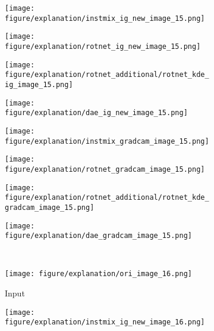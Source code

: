 \documentclass{article} \usepackage{iclr2021_conference,times}
\begin{document}
\begin{figure}[h!]
\begin{subfigure}{.11\textwidth}
  \centering
  \texttt{[image: figure/explanation/instmix\_ig\_new\_image\_15.png]}
\end{subfigure}
\hspace{-2mm}
\begin{subfigure}{.11\textwidth}
  \centering
  \texttt{[image: figure/explanation/rotnet\_ig\_new\_image\_15.png]}
\end{subfigure}
\hspace{-2mm}
\begin{subfigure}{.11\textwidth}
  \centering
  \texttt{[image: figure/explanation/rotnet\_additional/rotnet\_kde\_ig\_image\_15.png]}
\end{subfigure}
\hspace{-2mm}
\begin{subfigure}{.11\textwidth}
  \centering
  \texttt{[image: figure/explanation/dae\_ig\_new\_image\_15.png]}
\end{subfigure}
\hspace{-2mm}
\begin{subfigure}{.11\textwidth}
  \centering
  \texttt{[image: figure/explanation/instmix\_gradcam\_image\_15.png]}
\end{subfigure}
\hspace{-2mm}
\begin{subfigure}{.11\textwidth}
  \centering
  \texttt{[image: figure/explanation/rotnet\_gradcam\_image\_15.png]}
\end{subfigure}
\hspace{-2mm}
\begin{subfigure}{.11\textwidth}
  \centering
  \texttt{[image: figure/explanation/rotnet\_additional/rotnet\_kde\_gradcam\_image\_15.png]}
\end{subfigure}
\hspace{-2mm}
\begin{subfigure}{.11\textwidth}
  \centering
  \texttt{[image: figure/explanation/dae\_gradcam\_image\_15.png]}
\end{subfigure}\\
\begin{subfigure}{.11\textwidth}
  \centering
  \texttt{[image: figure/explanation/ori\_image\_16.png]}
  \caption{Input}
\end{subfigure}
\hspace{-2mm}
\begin{subfigure}{.11\textwidth}
  \centering
  \texttt{[image: figure/explanation/instmix\_ig\_new\_image\_16.png]}

\end{subfigure}
\end{figure}
\end{document}
